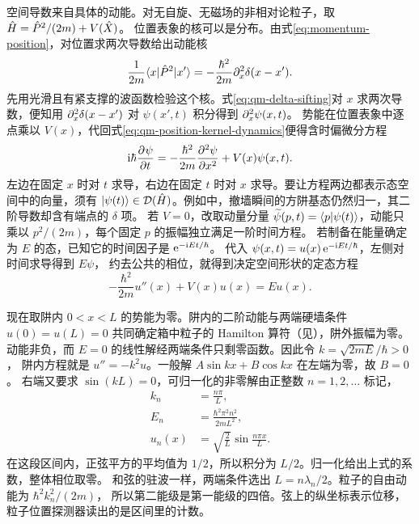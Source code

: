 空间导数来自具体的动能。对无自旋、无磁场的非相对论粒子，取 $\op H = \op P^2/(2m) + V(\op X)$。
位置表象的核可以是分布。由式\eqref{eq:momentum-position}，对位置求两次导数给出动能核
\begin{equation}
    \frac{1}{2m}\mel{x}{\op P^2}{x'} = -\frac{\hbar^2}{2m}\p_x^2\delta(x - x').
\end{equation}
先用光滑且有紧支撑的波函数检验这个核。式\eqref{eq:qm-delta-sifting}对 $x$ 求两次导数，便知用 $\p_x^2\delta(x - x')$ 对 $\psi(x',t)$ 积分得到 $\p_x^2\psi(x,t)$。
势能在位置表象中逐点乘以 $V(x)$，代回式\eqref{eq:qm-position-kernel-dynamics}便得含时偏微分方程
\begin{equation}
    \i\hbar\pv{\psi}{t}
    = -\frac{\hbar^2}{2m}\pv[2]{\psi}{x} + V(x)\psi(x,t).
    \label{eq:position-schrodinger}
\end{equation}
左边在固定 $x$ 时对 $t$ 求导，右边在固定 $t$ 时对 $x$ 求导。要让方程两边都表示态空间中的向量，须有 $\ket{\psi(t)} \in \Dom(\op H)$。例如中，撤墙瞬间的方阱基态仍然归一，其二阶导数却含有端点的 $\delta$ 项。
若 $V = 0$，改取动量分量 $\widetilde\psi(p,t) = \braket{p}{\psi(t)}$，动能只乘以 $p^2/(2m)$，每个固定 $p$ 的振幅独立满足一阶时间方程。
若制备在能量确定为 $E$ 的态，已知它的时间因子是 $\e^{-\i Et/\hbar}$。
代入 $\psi(x,t) = u(x)\e^{-\i Et/\hbar}$，左侧对时间求导得到 $E\psi$，
约去公共的相位，就得到决定空间形状的定态方程
\begin{equation}
    -\frac{\hbar^2}{2m}u''(x) + V(x)u(x) = Eu(x).
    \label{eq:position-stationary}
\end{equation}

现在取阱内 $0 < x < L$ 的势能为零。阱内的二阶动能与两端硬墙条件 $u(0) = u(L) = 0$ 共同确定箱中粒子的 Hamilton 算符（见），阱外振幅为零。
动能非负，而 $E = 0$ 的线性解经两端条件只剩零函数。因此令 $k = \sqrt{2mE}/\hbar > 0$，
阱内方程就是 $u'' = -k^2u$。一般解 $A\sin kx + B\cos kx$ 在左端为零，故 $B = 0$。
右端又要求 $\sin(kL) = 0$，可归一化的非零解由正整数 $n = 1,2,\ldots$ 标记，
\begin{subequations}
    \begin{align}
        k_n &= \frac{n\pi}{L},\\
        E_n &= \frac{\hbar^2\pi^2n^2}{2mL^2},\\
        u_n(x) &= \sqrt{\frac{2}{L}}\sin\frac{n\pi x}{L}.
    \end{align}
\end{subequations}
在这段区间内，正弦平方的平均值为 $1/2$，所以积分为 $L/2$。归一化给出上式的系数，整体相位取零。
和弦的驻波一样，两端条件选出 $L = n\lambda_n/2$。粒子的自由动能为 $\hbar^2k_n^2/(2m)$，
所以第二能级是第一能级的四倍。弦上的纵坐标表示位移，粒子位置探测器读出的是区间里的计数。

